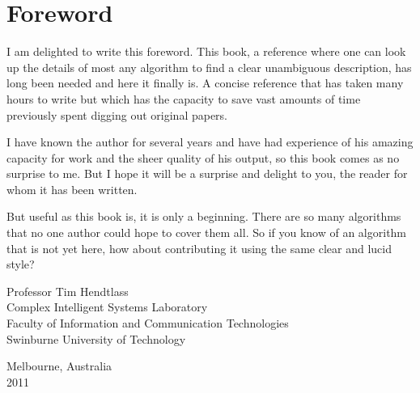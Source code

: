 % 
% 
\section*{Foreword}

I am delighted to write this foreword. This book, a reference where one can look up the details of most any algorithm to find a clear unambiguous description, has long been needed and here it finally is.  A concise reference that has taken many hours to write but which has the capacity to save vast amounts of time previously spent digging out original papers.

I have known the author for several years and have had experience of his amazing capacity for work and the sheer quality of his output, so this book comes as no surprise to me.  But I hope it will be a surprise and delight to you, the reader for whom it has been written.

But useful as this book is, it is only a beginning. There are so many algorithms that no one author could hope to cover them all. So if you know of an algorithm that is not yet here, how about contributing it using the same clear and lucid style?

\begin{flushright}
\vspace{0.5in}
Professor Tim Hendtlass \\
Complex Intelligent Systems Laboratory  \\
Faculty of Information and Communication Technologies  \\
Swinburne University of Technology
\end{flushright}

\begin{flushleft}
\vspace{0.2in}
Melbourne, Australia \\
2011
\end{flushleft}

